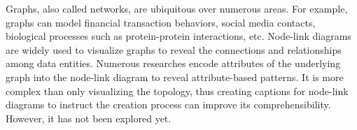 \maketitle

Graphs, also called networks, are ubiquitous over numerous areas. For example, graphs can model financial transaction behaviors, social media contacts, biological processes such as protein-protein interactions, etc.
Node-link diagrams are widely used to visualize graphs to reveal the connections and relationships among data entities.
Numerous researches encode attributes of the underlying graph into the node-link diagram to reveal attribute-based patterns.
It is more complex than only visualizing the topology, thus creating captions for node-link diagrams to instruct the creation process can improve its comprehensibility.
However, it has not been explored yet.


